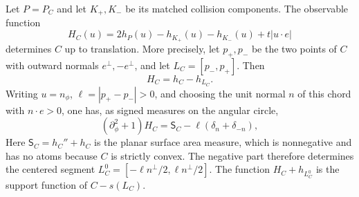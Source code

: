 \begin{lemma}
\label{lem:two-field-calibration}
Let $P=P_C$ and let $K_+,K_-$ be its matched collision components.
The observable function
\begin{equation}\label{eq:two-field-calibration-function}
 H_C(u)=2h_P(u)-h_{K_+}(u)-h_{K_-}(u)+t|u\cdot e|
\end{equation}
determines $C$ up to translation.  More precisely, let $p_+,p_-$
be the two points of $C$ with outward normals $e^\perp,-e^\perp$,
and let $L_C=[p_-,p_+]$.  Then
\begin{equation}\label{eq:two-field-chord-cancellation}
                         H_C=h_C-h_{L_C}.
\end{equation}
Writing $u=n_\phi$, $\ell=|p_+-p_-|>0$, and choosing the unit
normal $n$ of this chord with $n\cdot e>0$, one has, as signed
measures on the angular circle,
\begin{equation}\label{eq:two-field-curvature-measure}
 (\partial_\phi^2+1)H_C
    =\mathsf S_C-\ell(\delta_n+\delta_{-n}),
\end{equation}
Here $\mathsf S_C=h_C''+h_C$ is the planar surface area measure,
which is nonnegative and has no atoms because $C$ is strictly
convex.  The negative part therefore determines the centered segment
$L_C^0=[-\ell n^\perp/2,\ell n^\perp/2]$.  The function
$H_C+h_{L_C^0}$ is the support function of $C-s(L_C)$.
\end{lemma}
